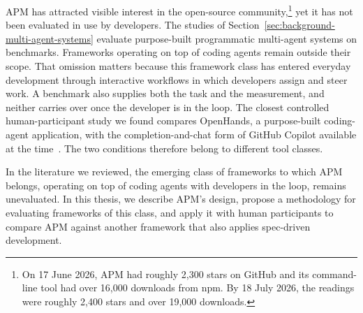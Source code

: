 APM has attracted visible interest in the open-source community,\footnote{On 17 June 2026, APM had roughly 2,300 stars on GitHub and its command-line tool had over 16,000 downloads from npm. By 18 July 2026, the readings were roughly 2,400 stars and over 19,000 downloads.} yet it has not been evaluated in use by developers. The studies of Section~\ref{sec:background-multi-agent-systems} evaluate purpose-built programmatic multi-agent systems on benchmarks. Frameworks operating on top of coding agents remain outside their scope. That omission matters because this framework class has entered everyday development through interactive workflows in which developers assign and steer work. A benchmark also supplies both the task and the measurement, and neither carries over once the developer is in the loop. The closest controlled human-participant study we found compares OpenHands, a purpose-built coding-agent application, with the completion-and-chat form of GitHub Copilot available at the time~\cite{chen2025codewith}. The two conditions therefore belong to different tool classes.

In the literature we reviewed, the emerging class of frameworks to which APM belongs, operating on top of coding agents with developers in the loop, remains unevaluated. In this thesis, we describe APM's design, propose a methodology for evaluating frameworks of this class, and apply it with human participants to compare APM against another framework that also applies spec-driven development.
